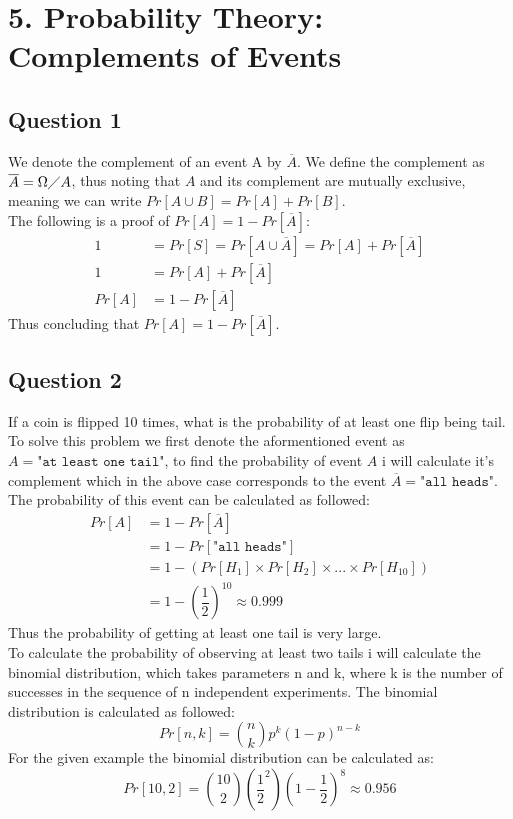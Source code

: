 \documentclass{article}
\begin{document}
\section{5. Probability Theory: Complements of Events}
\subsection{Question 1}
We denote the complement of an event A by $\overline{A}$. We define the complement as $\overline{A} = \Omega \diagup A$, thus noting that $A$ and its complement are mutually exclusive, meaning we can write $Pr[A\cup B] = Pr[A] + Pr[B]$. \\
The following is a proof of $Pr[A] = 1 - Pr[\overline{A}]$:
\begin{align*}
1 &= Pr[S] = Pr[A \cup \overline{A}] = Pr[A]+ Pr[\overline{A}] \\
1 &= Pr[A]+ Pr[\overline{A}] \\
Pr[A] &= 1 - Pr[\overline{A}]
\end{align*}
Thus concluding that $Pr[A] = 1 - Pr[\overline{A}]$.
\subsection{Question 2}
If a coin is flipped 10 times, what is the probability of at least one flip being tail. To solve this problem we first denote the aformentioned event as $A = \texttt{"at least one tail"}$, to find the probability of event $A$ i will calculate it's complement which in the above case corresponds to the event $\overline{A} = \texttt{"all heads"}$. The probability of this event can be calculated as followed:
\begin{align}
Pr[A] &= 1-Pr[\overline{A}] \\
&= 1-Pr[\texttt{"all heads"}] \\
&= 1 - \left( Pr[H_1] \times Pr[H_2] \times ... \times Pr[H_{10}] \right) \\
&= 1 - \left( \dfrac{1}{2} \right)^{10} \approx 0.999
\end{align}
Thus the probability of getting at least one tail is very large. \\
To calculate the probability of observing at least two tails i will calculate the binomial distribution, which takes parameters n and k, where k is the number of successes in the sequence of n independent experiments. The binomial distribution is calculated as followed:
$$
Pr[n,k] = \binom{n}{k}p^k(1-p)^{n-k}
$$
For the given example the binomial distribution can be calculated as:
$$
Pr[10,2] = \binom{10}{2} \left(\dfrac{1}{2}^2\right)\left(1-\dfrac{1}{2}\right)^8
\approx 0.956
$$
\end{document}
